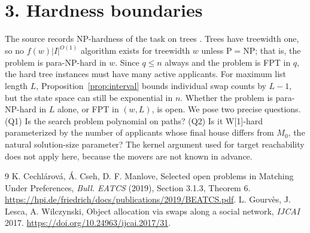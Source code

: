 \documentclass[11pt]{article}
\theoremstyle{definition}
\begin{document}
\section*{3. Hardness boundaries}
The source records NP-hardness of the task on trees \cite{ccm,glw}. Trees have treewidth one, so no
$f(w)|I|^{O(1)}$ algorithm exists for treewidth $w$ unless $\mathrm P=\mathrm{NP}$; that is, the problem is para-NP-hard
in $w$. Since $q\le n$ always and the problem is FPT in $q$, the hard tree instances must have many active applicants. For
maximum list length $L$, Proposition~\ref{prop:interval} bounds individual swap counts by $L-1$, but the state space can
still be exponential in $n$. Whether the problem is para-NP-hard in $L$ alone, or FPT in $(w,L)$, is open. We pose two
precise questions. (Q1) Is the search problem polynomial on paths? (Q2) Is it W[1]-hard parameterized by the number of
applicants whose final house differs from $M_0$, the natural solution-size parameter? The kernel argument used for target
reachability does not apply here, because the movers are not known in advance.

\begin{thebibliography}{9}
 K. Cechl\'arov\'a, \'A. Cseh, D. F. Manlove, Selected open problems in Matching Under Preferences,
\emph{Bull. EATCS} (2019), Section 3.1.3, Theorem 6. \url{https://hpi.de/friedrich/docs/publications/2019/BEATCS.pdf}.
 L. Gourv\`es, J. Lesca, A. Wilczynski, Object allocation via swaps along a social network, \emph{IJCAI}
2017. \url{https://doi.org/10.24963/ijcai.2017/31}.
\end{thebibliography}
\end{document}
